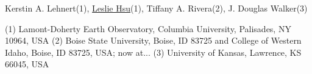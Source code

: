 Kerstin A. Lehnert(1), \href{https://www.authorea.com/users/7580}{Leslie Hsu}(1), Tiffany A. Rivera(2), J. Douglas Walker(3)

(1) Lamont-Doherty Earth Observatory, Columbia University, Palisades, NY 10964, USA
(2) Boise State University, Boise, ID 83725 and College of Western Idaho, Boise, ID 83725, USA; now at...
(3) University of Kansas, Lawrence, KS 66045, USA
